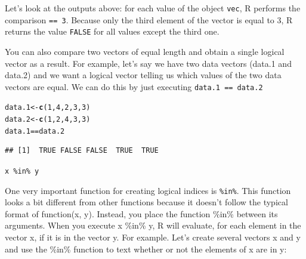 \documentclass{tufte-book}\usepackage[]{graphicx}\usepackage[]{color}
\makeatletter
\newcommand{\hlnum}[1]{\textcolor[rgb]{0.686,0.059,0.569}{#1}}%
\newcommand{\hlopt}[1]{\textcolor[rgb]{0,0,0}{#1}}%
\newcommand{\hlstd}[1]{\textcolor[rgb]{0.345,0.345,0.345}{#1}}%
\newcommand{\hlkwb}[1]{\textcolor[rgb]{0.69,0.353,0.396}{#1}}%
\newcommand{\hlkwd}[1]{\textcolor[rgb]{0.737,0.353,0.396}{\textbf{#1}}}%
\newenvironment{kframe}{%
 \def\at@end@of@kframe{}%
 \ifinner\ifhmode%
  \def\at@end@of@kframe{\end{minipage}}%
  \begin{minipage}{\columnwidth}%
 \fi\fi%
 \def\FrameCommand##1{\hskip\@totalleftmargin \hskip-\fboxsep
 \colorbox{shadecolor}{##1}\hskip-\fboxsep
     \hskip-\linewidth \hskip-\@totalleftmargin \hskip\columnwidth}%
 \MakeFramed {\advance\hsize-\width
   \@totalleftmargin\z@ \linewidth\hsize
   \@setminipage}}%
 {\par\unskip\endMakeFramed%
 \at@end@of@kframe}
\newenvironment{knitrout}{}{} %
\newcommand{\newfun}[1]{\begin{LARGE} \begin{center} \texttt{#1} \end{center} \end{LARGE}}
\makeatother
\begin{document}
\begin{footnotesize}
Let's look at the outputs above: for each value of the object \texttt{vec}, R performs the comparison \texttt{== 3}. Because only the third element of the vector is equal to 3, R returns the value \texttt{FALSE} for all values except the third one.

You can also compare two vectors of equal length and obtain a single logical vector as a result. For example, let's say we have two data vectors (data.1 and data.2) and we want a logical vector telling us which values of the two data vectors are equal. We can do this by just executing \texttt{data.1 == data.2}

\begin{footnotesize}
\begin{knitrout}
\color{fgcolor}\begin{kframe}
\begin{alltt}
\hlstd{data.1} \hlkwb{<-} \hlkwd{c}\hlstd{(}\hlnum{1}\hlstd{,} \hlnum{4}\hlstd{,} \hlnum{2}\hlstd{,} \hlnum{3}\hlstd{,} \hlnum{3}\hlstd{)}
\hlstd{data.2} \hlkwb{<-} \hlkwd{c}\hlstd{(}\hlnum{1}\hlstd{,} \hlnum{2}\hlstd{,} \hlnum{4}\hlstd{,} \hlnum{3}\hlstd{,} \hlnum{3}\hlstd{)}
\hlstd{data.1} \hlopt{==} \hlstd{data.2}
\end{alltt}
\begin{verbatim}
## [1]  TRUE FALSE FALSE  TRUE  TRUE
\end{verbatim}
\end{kframe}
\end{knitrout}
\end{footnotesize}

\newfun{x \%in\% y}

One very important function for creating logical indices is \texttt{\%in\%}. This function looks a bit different from other functions because it doesn't follow the typical format of function(x, y). Instead, you place the function \%in\% between its arguments. When you execute x \%in\% y, R will evaluate, for each element in the vector x, if it is in the vector y. For example. Let's create several vectors x and y and use the \%in\% function to text whether or not the elements of x are in y:



\end{footnotesize}
\end{document}
